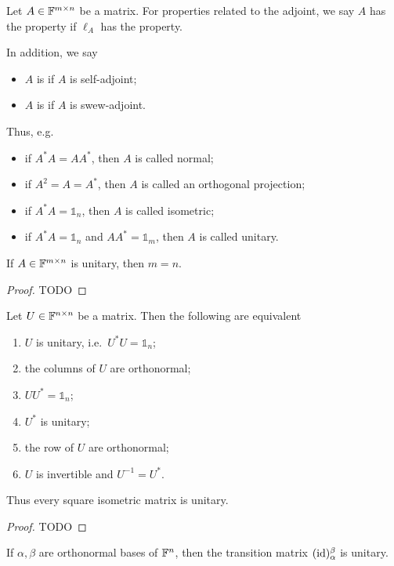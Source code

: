 \begin{definition}
Let $A\in\mathbb{F}^{m\times n}$ be a matrix. For properties related to the adjoint, we say $A$ has the property if $\ell_A$ has the property.

In addition, we say
\begin{itemize}
\item $A$ is  if $A$ is self-adjoint;
\item $A$ is  if $A$ is swew-adjoint.
\end{itemize}
\end{definition}
Thus, e.g.\
\begin{itemize}
\item if $A^*A = AA^*$, then $A$ is called normal;
\item if $A^2 = A = A^*$, then $A$ is called an orthogonal projection;
\item if $A^*A = \mathbb{1}_n$, then $A$ is called isometric;
\item if $A^*A = \mathbb{1}_n$ and $AA^* = \mathbb{1}_m$, then $A$ is called unitary.
\end{itemize}

\begin{lemma}
If $A\in \mathbb{F}^{m\times n}$ is unitary, then $m=n$.
\end{lemma}
\begin{proof}
TODO
\end{proof}

\begin{lemma}
Let $U\in\mathbb{F}^{n\times n}$ be a matrix. Then the following are equivalent
\begin{enumerate}
\item $U$ is unitary, i.e.\ $U^*U=\mathbb{1}_n$;
\item the columns of $U$ are orthonormal;
\item $UU^*=\mathbb{1}_n$;
\item $U^*$ is unitary;
\item the row of $U$ are orthonormal;
\item $U$ is invertible and $U^{-1} = U^*$.
\end{enumerate}
\end{lemma}
Thus every square isometric matrix is unitary.
\begin{proof}
TODO
\end{proof}

\begin{corollary}
If $\alpha,\beta$ are orthonormal bases of $\mathbb{F}^{n}$, then the transition matrix $(\operatorname{id})_\alpha^\beta$ is unitary.
\end{corollary}


